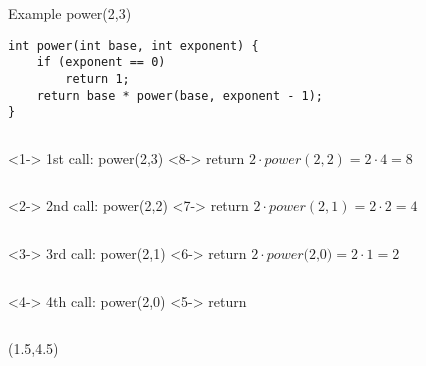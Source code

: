 \begin{frame}[fragile]{Example {power(2,3)}}
	\begin{lstlisting}
int power(int base, int exponent) {
	if (exponent == 0)
		return 1;
	return base * power(base, exponent - 1);
}\end{lstlisting}
	\begin{columns}[T]
		<1->
		1st call: power(2,3) 
		<8->
		 return \begin{math}{2 \cdot {power(2,2)} = 2 \cdot 4 = 8} \end{math}  
	\end{columns}
    \vspace{5mm}
    \begin{columns}[T]
		<2->
		2nd call: power(2,2) 
		 return \begin{math}{2 \cdot {power(2,1)} = 2 \cdot 2 = 4} \end{math} 
	\end{columns}
    \vspace{5mm}
    \begin{columns}[T]
		<3->
		3rd call: power(2,1)   
		<6->
		 return \begin{math}{2 \cdot \textit{power(2,0)} = 2 \cdot 1 = 2} \end{math}   
	\end{columns}
    \vspace{5mm}
	\begin{columns}[T]
		<4->
		4th call: power(2,0)   
		<5->
		 return \begin{math}{1} \end{math} 
	\end{columns}

	\begin{textblock}{7}(1.5,4.5)
	\end{textblock}
\end{frame}

